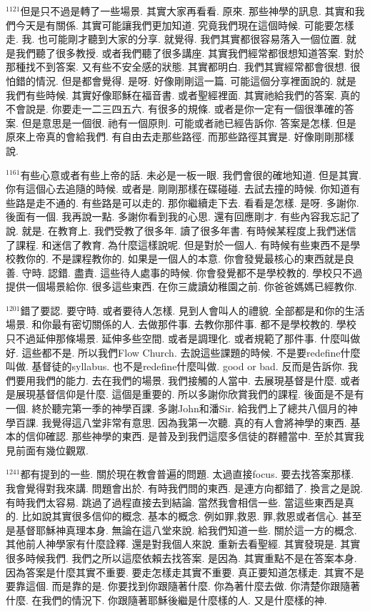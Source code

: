 \documentclass{book}
\begin{document}
$^{1121}$但是只不過是轉了一些場景.
其實大家再看看.
原來.
那些神學的訊息.
其實和我們今天是有關係.
其實可能讓我們更加知道.
究竟我們現在這個時候.
可能要怎樣走.
我.
也可能剛才聽到大家的分享.
就覺得.
我們其實都很容易落入一個位置.
就是我們聽了很多教授.
或者我們聽了很多講座.
其實我們經常都很想知道答案.
對於那種找不到答案.
又有些不安全感的狀態.
其實都明白.
我們其實經常都會很想.
很怕錯的情況.
但是都會覺得.
是呀.
好像剛剛這一篇.
可能這個分享裡面說的.
就是我們有些時候.
其實好像耶穌在福音書.
或者聖經裡面.
其實祂給我們的答案.
真的不會說是.
你要走一二三四五六.
有很多的規條.
或者是你一定有一個很準確的答案.
但是意思是一個很.
祂有一個原則.
可能或者祂已經告訴你.
答案是怎樣.
但是原來上帝真的會給我們.
有自由去走那些路徑.
而那些路徑其實是.
好像剛剛那樣說.

$^{1161}$有些心意或者有些上帝的話.
未必是一板一眼.
我們會很的確地知道.
但是其實.
你有這個心去追隨的時候.
或者是.
剛剛那樣在碟碰碰.
去試去撞的時候.
你知道有些路是走不通的.
有些路是可以走的.
那你繼續走下去.
看看是怎樣.
是呀.
多謝你.
後面有一個.
我再說一點.
多謝你看到我的心思.
還有回應剛才.
有些內容我忘記了說.
就是.
在教育上.
我們受教了很多年.
讀了很多年書.
有時候某程度上我們迷信了課程.
和迷信了教育.
為什麼這樣說呢.
但是對於一個人.
有時候有些東西不是學校教你的.
不是課程教你的.
如果是一個人的本意.
你會發覺最核心的東西就是良善.
守時.
認錯.
盡責.
這些待人處事的時候.
你會發覺都不是學校教的.
學校只不過提供一個場景給你.
很多這些東西.
在你三歲讀幼稚園之前.
你爸爸媽媽已經教你.

$^{1201}$錯了要認.
要守時.
或者要待人怎樣.
見到人會叫人的禮貌.
全部都是和你的生活場景.
和你最有密切關係的人.
去做那件事.
去教你那件事.
都不是學校教的.
學校只不過延伸那條場景.
延伸多些空間.
或者是調理化.
或者規範了那件事.
什麼叫做好.
這些都不是.
所以我們Flow Church.
去說這些課題的時候.
不是要redefine什麼叫做.
基督徒的syllabus.
也不是redefine什麼叫做.
good or bad.
反而是告訴你.
我們要用我們的能力.
去在我們的場景.
我們接觸的人當中.
去展現基督是什麼.
或者是展現基督信仰是什麼.
這個是重要的.
所以多謝你欣賞我們的課程.
後面是不是有一個.
終於聽完第一季的神學百課.
多謝John和潘Sir.
給我們上了總共八個月的神學百課.
我覺得這八堂非常有意思.
因為我第一次聽.
真的有人會將神學的東西.
基本的信仰確認.
那些神學的東西.
是普及到我們這麼多信徒的群體當中.
至於其實我見前面有幾位觀眾.

$^{1241}$都有提到的一些.
關於現在教會普遍的問題.
太過直接focus.
要去找答案那樣.
我會覺得對我來講.
問題會出於.
有時我們問的東西.
是連方向都錯了.
換言之是說.
有時我們太容易.
跳過了過程直接去到結論.
當然我會相信一些.
當這些東西是真的.
比如說其實很多信仰的概念.
基本的概念.
例如罪,救恩.
罪,救恩或者信心.
甚至是基督耶穌神真理本身.
無論在這八堂來說.
給我們知道一些.
關於這一方的概念.
其他前人神學家有什麼詮釋.
還是對我個人來說.
重新去看聖經.
其實發現是.
其實很多時候我們.
我們之所以這麼依賴去找答案.
是因為.
其實重點不是在答案本身.
因為答案是什麼其實不重要.
要走怎樣走其實不重要.
真正要知道怎樣走.
其實不是要靠這個.
而是靠的是.
你要找到你跟隨著什麼.
你為著什麼去做.
你清楚你跟隨著什麼.
在我們的情況下.
你跟隨著耶穌後繼是什麼樣的人.
又是什麼樣的神.
\end{document}
